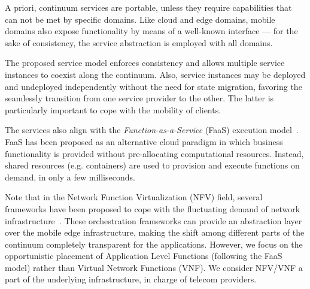 A priori, continuum services are portable, unless they require capabilities that can not be met by specific domains. Like cloud and edge domains, mobile domains also expose functionality by means of a well-known interface --- for the sake of consistency, the service abstraction is employed with all domains.

The proposed service model enforces consistency and allows multiple service instances to coexist along the continuum. Also, service instances may be deployed and undeployed independently without the need for state migration, favoring the seamlessly transition from one service provider to the other. The latter is particularly important to cope with the mobility of clients.

The services also align with the \textit{Function-as-a-Service} (FaaS) execution model~\cite{MateosFaaster17}. FaaS has been proposed as an alternative cloud paradigm in which business functionality is provided without pre-allocating computational resources. Instead, shared resources (e.g. containers) are used to provision and execute functions on demand, in only a few milliseconds. 


Note that in the Network Function Virtualization (NFV) field, several frameworks have been proposed to cope with the fluctuating demand of network infrastructure~\cite{etsimano17,cloudify14}. These orchestration frameworks can provide an abstraction layer over the mobile edge infrastructure, making the shift among different parts of the continuum completely transparent for the applications. However, we focus on the opportunistic placement of Application Level Functions (following the FaaS model) rather than Virtual Network Functions (VNF). We consider NFV/VNF a part of the underlying infrastructure, in charge of telecom providers.


